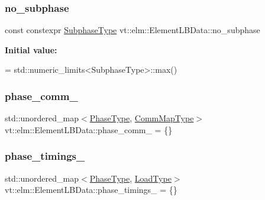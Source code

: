 \subsubsection{\texorpdfstring{no\+\_\+subphase}{no\_subphase}}
{\footnotesize\ttfamily const constexpr \hyperlink{namespacevt_ae78cbfdf1e57470e33eedb074f2beeba}{Subphase\+Type} vt\+::elm\+::\+Element\+L\+B\+Data\+::no\+\_\+subphase\hspace{0.3cm}{\ttfamily [static]}}

{\bfseries Initial value\+:}
\begin{DoxyCode}
=
    std::numeric\_limits<SubphaseType>::max()
\end{DoxyCode}
\mbox{\label{structvt_1_1elm_1_1_element_l_b_data_a343d66fb777c54e0bdaaddf6f54eda85}} 
\subsubsection{\texorpdfstring{phase\+\_\+comm\+\_\+}{phase\_comm\_}}
{\footnotesize\ttfamily std\+::unordered\+\_\+map$<$\hyperlink{namespacevt_a46ce6733d5cdbd735d561b7b4029f6d7}{Phase\+Type}, \hyperlink{namespacevt_1_1elm_a38487cb8896b9b4763efa9022fab560e}{Comm\+Map\+Type}$>$ vt\+::elm\+::\+Element\+L\+B\+Data\+::phase\+\_\+comm\+\_\+ = \{\}\hspace{0.3cm}{\ttfamily [protected]}}

\mbox{\label{structvt_1_1elm_1_1_element_l_b_data_af806cbf36d30d07e340577aeffe06810}} 
\subsubsection{\texorpdfstring{phase\+\_\+timings\+\_\+}{phase\_timings\_}}
{\footnotesize\ttfamily std\+::unordered\+\_\+map$<$\hyperlink{namespacevt_a46ce6733d5cdbd735d561b7b4029f6d7}{Phase\+Type}, \hyperlink{namespacevt_a8fb51741340b87d7aaee0bef60e9896b}{Load\+Type}$>$ vt\+::elm\+::\+Element\+L\+B\+Data\+::phase\+\_\+timings\+\_\+ = \{\}\hspace{0.3cm}{\ttfamily [protected]}}


